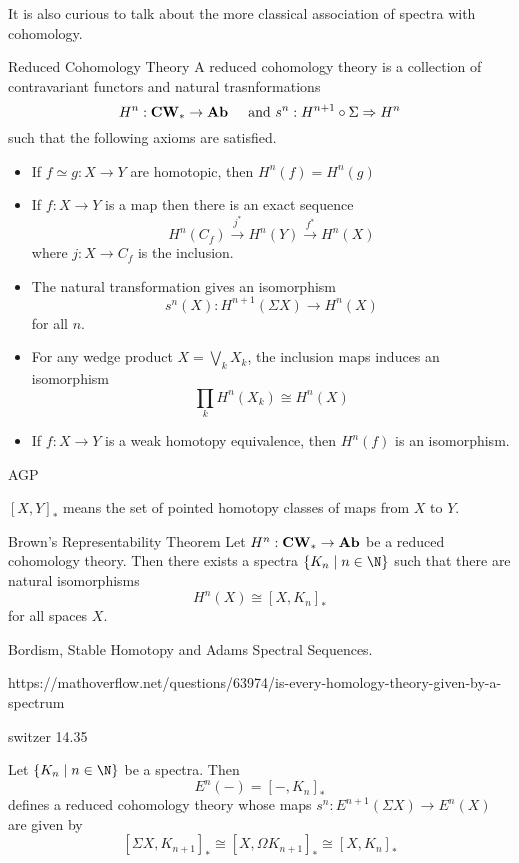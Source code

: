 \documentclass[a4paper]{article}
\begin{document}
It is also curious to talk about the more classical association of spectra with cohomology. 

\begin{defn}{Reduced Cohomology Theory}{} A reduced cohomology theory is a collection of contravariant functors and natural trasnformations $$H^n:\bold{CW}_\ast\to\bold{Ab}\;\;\;\;\text{ and }s^n:H^{n+1}\circ\Sigma\Rightarrow H^n$$ such that the following axioms are satisfied. 
\begin{itemize}
\item If $f\simeq g:X\to Y$ are homotopic, then $H^n(f)=H^n(g)$
\item If $f:X\to Y$ is a map then there is an exact sequence $$H^n(C_f)\overset{j^\ast}{\rightarrow}H^n(Y)\overset{f^\ast}{\rightarrow}H^n(X)$$ where $j:X\to C_f$ is the inclusion. 
\item The natural transformation gives an isomorphism $$s^n(X):H^{n+1}(\Sigma X)\to H^n(X)$$ for all $n$. 
\item For any wedge product $X=\bigvee_k X_k$, the inclusion maps induces an isomorphism $$\prod_k H^n(X_k)\cong H^n(X)$$
\item If $f:X\to Y$ is a weak homotopy equivalence, then $H^n(f)$ is an isomorphism. 
\end{itemize}
\end{defn}

AGP

$[X,Y]_\ast$ means the set of pointed homotopy classes of maps from $X$ to $Y$. 

\begin{thm}{Brown's Representability Theorem}{} Let $H^n:\bold{CW}_\ast\to\bold{Ab}$ be a reduced cohomology theory. Then there exists a spectra $\{K_n\;|\;n\in\N\}$ such that there are natural isomorphisms $$H^n(X)\cong[X,K_n]_\ast$$ for all spaces $X$. 
\end{thm}

Bordism, Stable Homotopy and Adams Spectral Sequences. 

https://mathoverflow.net/questions/63974/is-every-homology-theory-given-by-a-spectrum

switzer 14.35

\begin{prp}{}{} Let $\{K_n\;|\;n\in\N\}$ be a spectra. Then $$E^n(-)=[-,K_n]_\ast$$ defines a reduced cohomology theory whose maps $s^n:E^{n+1}(\Sigma X)\to E^n(X)$ are given by $$[\Sigma X,K_{n+1}]_\ast\cong[X,
\Omega K_{n+1}]_\ast\cong[X, K_n]_\ast$$
\end{prp}
\end{document}
